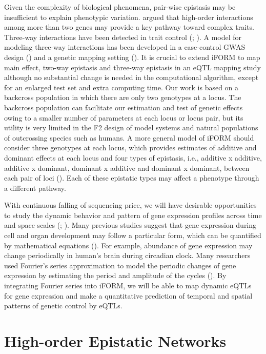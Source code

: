 \documentclass[11pt,]{book}
\theoremstyle{definition}
\theoremstyle{definition}
\theoremstyle{remark}
\begin{document}
Given the complexity of biological phenomena, pair-wise epistasis may be
insufficient to explain phenotypic variation.
\cite{imielinski2008exploiting} argued that high-order interactions
among more than two genes may provide a key pathway toward complex
traits. Three-way interactions have been detected in trait control
(\cite{mcmullen1998quantitative}; \cite{stich2007power}). A model for
modeling three-way interactions has been developed in a case-control
GWAS design (\cite{wang2010general}) and a genetic mapping setting
(\cite{pang2013statistical}). It is crucial to extend iFORM to map main
effect, two-way epistasis and three-way epistasis in an eQTL mapping
study although no substantial change is needed in the computational
algorithm, except for an enlarged test set and extra computing time. Our
work is based on a backcross population in which there are only two
genotypes at a locus. The backcross population can facilitate our
estimation and test of genetic effects owing to a smaller number of
parameters at each locus or locus pair, but its utility is very limited
in the F2 design of model systems and natural populations of outcrossing
species such as humans. A more general model of iFORM should consider
three genotypes at each locus, which provides estimates of additive and
dominant effects at each locus and four types of epistasis, i.e.,
additive x additive, additive x dominant, dominant x additive and
dominant x dominant, between each pair of loci
(\cite{kempthorne1968correlation}). Each of these epistatic types may
affect a phenotype through a different pathway.

With continuous falling of sequencing price, we will have desirable
opportunities to study the dynamic behavior and pattern of gene
expression profiles across time and space scales
(\cite{vinuela2010genome}; \cite{ackermann2013impact}). Many previous
studies suggest that gene expression during cell and organ development
may follow a particular form, which can be quantified by mathematical
equations (\cite{kim2010wavelet}). For example, abundance of gene
expression may change periodically in human's brain during circadian
clock. Many researchers used Fourier's series approximation to model the
periodic changes of gene expression by estimating the period and
amplitude of the cycles (\cite{li2013using}). By integrating Fourier
series into iFORM, we will be able to map dynamic eQTLs for gene
expression and make a quantitative prediction of temporal and spatial
patterns of genetic control by eQTLs.

\hypertarget{highorder}{\chapter{High-order Epistatic
Networks}\label{highorder}}
\end{document}
